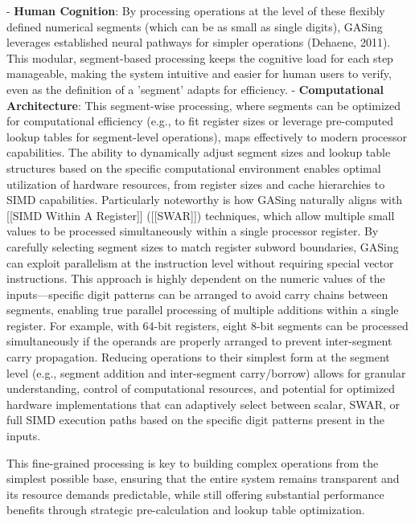 - \textbf{Human Cognition}: By processing operations at the level of these flexibly defined numerical segments (which can be as small as single digits), GASing leverages established neural pathways for simpler operations (Dehaene, 2011). This modular, segment-based processing keeps the cognitive load for each step manageable, making the system intuitive and easier for human users to verify, even as the definition of a 'segment' adapts for efficiency.
- \textbf{Computational Architecture}: This segment-wise processing, where segments can be optimized for computational efficiency (e.g., to fit register sizes or leverage pre-computed lookup tables for segment-level operations), maps effectively to modern processor capabilities. The ability to dynamically adjust segment sizes and lookup table structures based on the specific computational environment enables optimal utilization of hardware resources, from register sizes and cache hierarchies to SIMD capabilities. Particularly noteworthy is how GASing naturally aligns with [[SIMD Within A Register]] ([[SWAR]]) techniques, which allow multiple small values to be processed simultaneously within a single processor register. By carefully selecting segment sizes to match register subword boundaries, GASing can exploit parallelism at the instruction level without requiring special vector instructions. This approach is highly dependent on the numeric values of the inputs—specific digit patterns can be arranged to avoid carry chains between segments, enabling true parallel processing of multiple additions within a single register. For example, with 64-bit registers, eight 8-bit segments can be processed simultaneously if the operands are properly arranged to prevent inter-segment carry propagation. Reducing operations to their simplest form at the segment level (e.g., segment addition and inter-segment carry/borrow) allows for granular understanding, control of computational resources, and potential for optimized hardware implementations that can adaptively select between scalar, SWAR, or full SIMD execution paths based on the specific digit patterns present in the inputs.

This fine-grained processing is key to building complex operations from the simplest possible base, ensuring that the entire system remains transparent and its resource demands predictable, while still offering substantial performance benefits through strategic pre-calculation and lookup table optimization.

